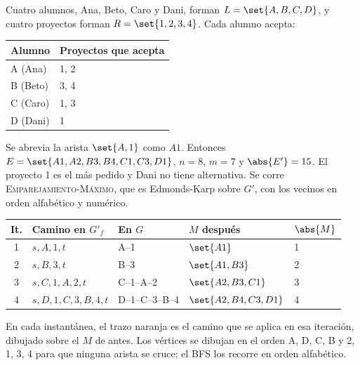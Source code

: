 \documentclass[11pt,letterpaper]{article}
\begin{document}
\begin{ejemplo}
  \label{ej:emparejamiento-alumnos}
  Cuatro alumnos, Ana, Beto, Caro y Dani, forman
  $L = \set{A, B, C, D}$, y cuatro proyectos forman
  $R = \set{1, 2, 3, 4}$. Cada alumno acepta:
  \begin{center}
  \small
  \begin{tabular}{ll}
    \toprule
    \textbf{Alumno} & \textbf{Proyectos que acepta} \\
    \midrule
    A (Ana) & 1, 2 \\
    B (Beto) & 3, 4 \\
    C (Caro) & 1, 3 \\
    D (Dani) & 1 \\
    \bottomrule
  \end{tabular}
  \end{center}
  Se abrevia la arista $\set{A, 1}$ como $A1$. Entonces
  $E = \set{A1, A2, B3, B4, C1, C3, D1}$, $n = 8$, $m = 7$ y
  $\abs{E'} = 15$. El proyecto 1 es el más pedido y Dani no tiene
  alternativa. Se corre \textsc{Emparejamiento-Máximo}, que es
  Edmonds-Karp sobre $G'$, con los vecinos en orden alfabético y
  numérico.
  \begin{center}
  \small
  \begin{tabular}{cllll}
    \toprule
    \textbf{It.} & \textbf{Camino en $G'_f$} & \textbf{En $G$}
      & \textbf{$M$ después} & $\abs{M}$ \\
    \midrule
    1 & $s, A, 1, t$ & A--1 & $\set{A1}$ & 1 \\
    2 & $s, B, 3, t$ & B--3 & $\set{A1, B3}$ & 2 \\
    3 & $s, C, 1, A, 2, t$ & C--1--A--2 & $\set{A2, B3, C1}$ & 3 \\
    4 & $s, D, 1, C, 3, B, 4, t$ & D--1--C--3--B--4
      & $\set{A2, B4, C3, D1}$ & 4 \\
    \bottomrule
  \end{tabular}
  \end{center}
  En cada instantánea, el trazo naranja es el camino que se aplica en
  esa iteración, dibujado sobre el $M$ de antes. Los vértices se
  dibujan en el orden A, D, C, B y 2, 1, 3, 4 para que ninguna arista
  se cruce; el BFS los recorre en orden alfabético.
  \begin{center}
\end{center}
\end{ejemplo}
\end{document}
